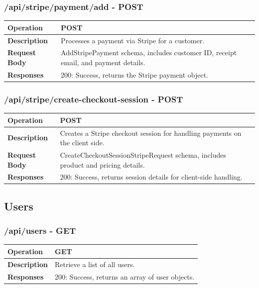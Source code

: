 \subsubsection*{/api/stripe/payment/add - POST}
\begin{tabular}{|>{\raggedright\arraybackslash}p{3cm}|p{12cm}|}
\hline
\textbf{Operation} & POST \\
\hline
\textbf{Description} & Processes a payment via Stripe for a customer. \\
\hline
\textbf{Request Body} & AddStripePayment schema, includes customer ID, receipt email, and payment details. \\
\hline
\textbf{Responses} & 200: Success, returns the Stripe payment object. \\
\hline
\end{tabular}

\subsubsection*{/api/stripe/create-checkout-session - POST}
\begin{tabular}{|>{\raggedright\arraybackslash}p{3cm}|p{12cm}|}
\hline
\textbf{Operation} & POST \\
\hline
\textbf{Description} & Creates a Stripe checkout session for handling payments on the client side. \\
\hline
\textbf{Request Body} & CreateCheckoutSessionStripeRequest schema, includes product and pricing details. \\
\hline
\textbf{Responses} & 200: Success, returns session details for client-side handling. \\
\hline
\end{tabular}

\subsection{Users}

\subsubsection*{/api/users - GET}
\begin{tabular}{|>{\raggedright\arraybackslash}p{3cm}|p{12cm}|}
\hline
\textbf{Operation} & GET \\
\hline
\textbf{Description} & Retrieve a list of all users. \\
\hline
\textbf{Responses} & 200: Success, returns an array of user objects. \\
\hline
\end{tabular}


